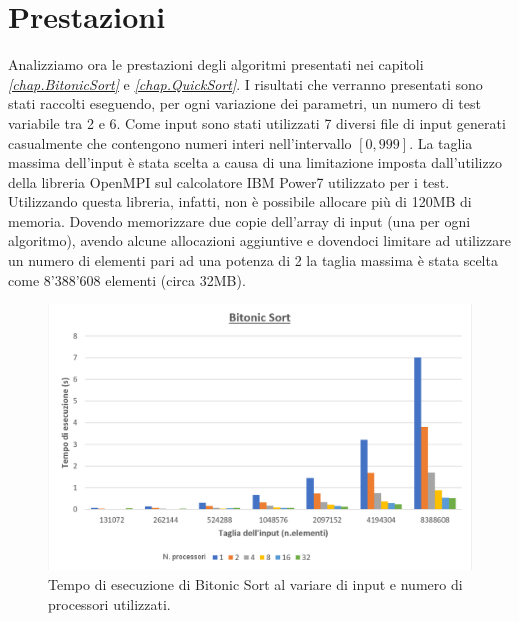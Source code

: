 \chapter{Prestazioni}
Analizziamo ora le prestazioni degli algoritmi presentati nei capitoli  \textit{\ref{chap.BitonicSort}} e \textit{\ref{chap.QuickSort}}. I risultati che verranno presentati sono stati raccolti eseguendo, per ogni variazione dei parametri, un numero di test variabile tra 2 e 6. Come input sono stati utilizzati 7 diversi file di input generati casualmente che contengono numeri interi nell'intervallo $[0,999]$. La taglia massima dell'input è stata scelta a causa di una limitazione imposta dall'utilizzo della libreria OpenMPI sul calcolatore IBM Power7 utilizzato per i test. Utilizzando questa libreria, infatti, non è possibile allocare più di 120MB di memoria. Dovendo memorizzare due copie dell'array di input (una per ogni algoritmo), avendo alcune allocazioni aggiuntive e dovendoci limitare ad utilizzare un numero di elementi pari ad una potenza di 2 la taglia massima è stata scelta come 8'388'608 elementi (circa 32MB).

\begin{figure}[H]
\centering
\includegraphics[scale=0.35]{images/BitonicSort}
\caption{\footnotesize{Tempo di esecuzione di Bitonic Sort al variare di input e numero di processori utilizzati.}}\label{img.BitonicSort}
\end{figure}

